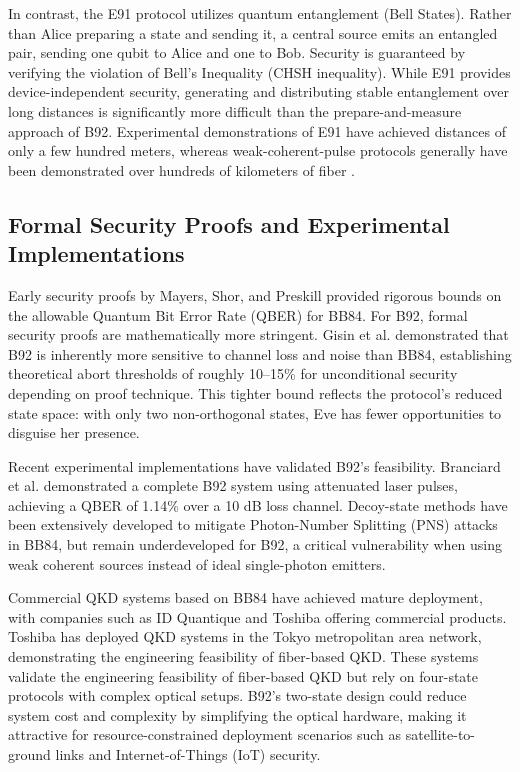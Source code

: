\documentclass[conference]{IEEEtran}
\begin{document}
In contrast, the E91 protocol utilizes quantum entanglement (Bell States). Rather than Alice preparing a state and sending it, a central source emits an entangled pair, sending one qubit to Alice and one to Bob. Security is guaranteed by verifying the violation of Bell's Inequality (CHSH inequality). While E91 provides device-independent security, generating and distributing stable entanglement over long distances is significantly more difficult than the prepare-and-measure approach of B92. Experimental demonstrations of E91 have achieved distances of only a few hundred meters, whereas weak-coherent-pulse protocols generally have been demonstrated over hundreds of kilometers of fiber \cite{takesue2007experimental}.

\subsection{Formal Security Proofs and Experimental Implementations}
Early security proofs by Mayers, Shor, and Preskill provided rigorous bounds on the allowable Quantum Bit Error Rate (QBER) for BB84. For B92, formal security proofs are mathematically more stringent. Gisin et al. \cite{gisin2002quantum} demonstrated that B92 is inherently more sensitive to channel loss and noise than BB84, establishing theoretical abort thresholds of roughly 10--15\% for unconditional security depending on proof technique. This tighter bound reflects the protocol's reduced state space: with only two non-orthogonal states, Eve has fewer opportunities to disguise her presence.

Recent experimental implementations have validated B92's feasibility. Branciard et al. \cite{branciard2010single} demonstrated a complete B92 system using attenuated laser pulses, achieving a QBER of 1.14\% over a 10 dB loss channel. Decoy-state methods \cite{lo2005decoy} have been extensively developed to mitigate Photon-Number Splitting (PNS) attacks in BB84, but remain underdeveloped for B92, a critical vulnerability when using weak coherent sources instead of ideal single-photon emitters.

Commercial QKD systems based on BB84 have achieved mature deployment, with companies such as ID Quantique and Toshiba offering commercial products. Toshiba has deployed QKD systems in the Tokyo metropolitan area network, demonstrating the engineering feasibility of fiber-based QKD. These systems validate the engineering feasibility of fiber-based QKD but rely on four-state protocols with complex optical setups. B92's two-state design could reduce system cost and complexity by simplifying the optical hardware, making it attractive for resource-constrained deployment scenarios such as satellite-to-ground links and Internet-of-Things (IoT) security.
\end{document}
